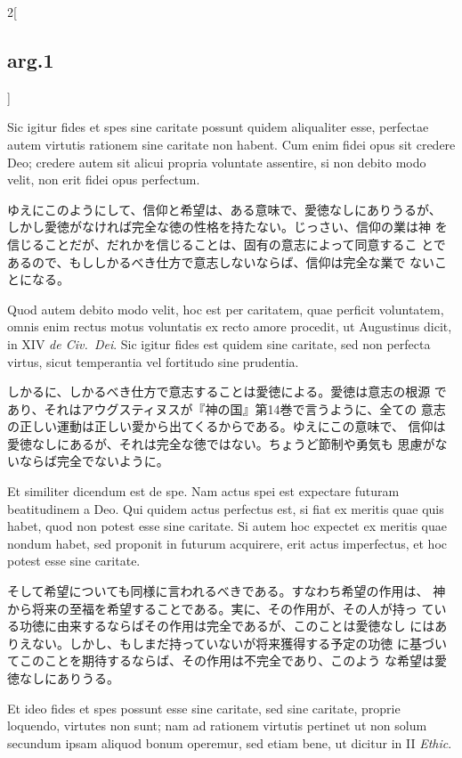 \documentclass[paper=a4paper,fontsize=10pt,jafontsize=9pt,titlepage]{jlreq}
\begin{document}
\begin{paracol}{2}[\subsection{arg.1}]
\switchcolumn*

Sic igitur fides et spes sine caritate possunt quidem aliqualiter
 esse, perfectae autem virtutis rationem sine caritate non habent. Cum
 enim fidei opus sit credere Deo; credere autem sit alicui propria
 voluntate assentire, si non debito modo velit, non erit fidei opus
 perfectum.

\switchcolumn

ゆえにこのようにして、信仰と希望は、ある意味で、愛徳なしにありうるが、
 しかし愛徳がなければ完全な徳の性格を持たない。じっさい、信仰の業は神
 を信じることだが、だれかを信じることは、固有の意志によって同意するこ
 とであるので、もししかるべき仕方で意志しないならば、信仰は完全な業で
 ないことになる。

\switchcolumn*

Quod autem debito modo velit, hoc est per caritatem, quae perficit
 voluntatem, omnis enim rectus motus voluntatis ex recto amore
 procedit, ut Augustinus dicit, in XIV {\itshape de Civ.~Dei}. Sic
 igitur fides est quidem sine caritate, sed non perfecta virtus, sicut
 temperantia vel fortitudo sine prudentia.

\switchcolumn

しかるに、しかるべき仕方で意志することは愛徳による。愛徳は意志の根源
 であり、それはアウグスティヌスが『神の国』第14巻で言うように、全ての
 意志の正しい運動は正しい愛から出てくるからである。ゆえにこの意味で、
 信仰は愛徳なしにあるが、それは完全な徳ではない。ちょうど節制や勇気も
 思慮がないならば完全でないように。

\switchcolumn*

Et similiter dicendum est de spe. Nam actus spei est expectare
 futuram beatitudinem a Deo. Qui quidem actus perfectus est, si fiat
 ex meritis quae quis habet, quod non potest esse sine caritate. Si
 autem hoc expectet ex meritis quae nondum habet, sed proponit in
 futurum acquirere, erit actus imperfectus, et hoc potest esse sine
 caritate.

\switchcolumn

そして希望についても同様に言われるべきである。すなわち希望の作用は、
 神から将来の至福を希望することである。実に、その作用が、その人が持っ
 ている功徳に由来するならばその作用は完全であるが、このことは愛徳なし
 にはありえない。しかし、もしまだ持っていないが将来獲得する予定の功徳
 に基づいてこのことを期待するならば、その作用は不完全であり、このよう
 な希望は愛徳なしにありうる。

\switchcolumn*

Et ideo fides et spes possunt esse sine caritate, sed sine caritate,
 proprie loquendo, virtutes non sunt; nam ad rationem virtutis
 pertinet ut non solum secundum ipsam aliquod bonum operemur, sed
 etiam bene, ut dicitur in II {\itshape Ethic}.


\end{paracol}
\end{document}
